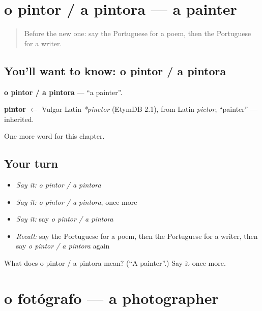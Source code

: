 \section[o pintor / a pintora]{o pintor / a pintora — a painter}

\label{lesson:PT-C190-pintor-a-pintora}



\begin{quote}
Before the new one: say the Portuguese for a poem, then the Portuguese for a writer.
\end{quote}

\subsection*{You'll want to know: o pintor / a pintora}
\textbf{o pintor / a pintora} — \textquotedblleft{}a painter\textquotedblright{}.

\begin{cousinweb}
\textbf{pintor} $\leftarrow$ Vulgar Latin \emph{*pinctor} (EtymDB 2.1), from Latin \emph{pictor}, \textquotedblleft{}painter\textquotedblright{} — inherited.
\end{cousinweb}

\begin{grammarlens}[title={What you've built}]
One more word for this chapter.
\end{grammarlens}

\subsection*{Your turn}
\begin{itemize}
\raggedright
  \item \emph{Say it:} \emph{o pintor / a pintora}
  \item \emph{Say it:} \emph{o pintor / a pintora}, once more
  \item \emph{Say it:} say \emph{o pintor / a pintora}
  \item \emph{Recall:} say the Portuguese for a poem, then the Portuguese for a writer, then say \emph{o pintor / a pintora} again
\end{itemize}

\begin{tcolorbox}[breakable,colback=teal!4,colframe=teal!35!black,title={Before you move on}]
What does o pintor / a pintora mean? (\textquotedblleft{}A painter\textquotedblright{}.) Say it once more.
\end{tcolorbox}
\section[o fotógrafo]{o fotógrafo — a photographer}

